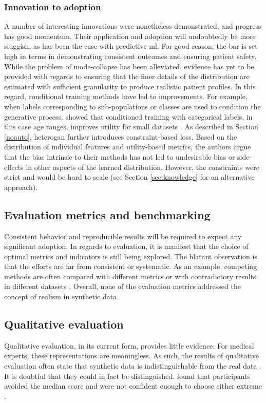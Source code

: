 \subsubsection{Innovation to adoption}
A number of interesting innovations were nonetheless demonstrated, and progress has good momentum. Their application and adoption will undoubtedly be more sluggish, as has been the case with predictive \gls{ml}. For good reason, the bar is set high in terms in demonstrating consistent outcomes and ensuring patient safety. While the problem of \gls{mode-collapse} has been alleviated, evidence has yet to be provided with regards to ensuring that the finer details of the distribution are estimated with sufficient granularity to produce realistic patient profiles. In this regard, conditional training methods have led to improvements. For example, when labels corresponding to sub-populations or classes are used to condition the generative process. \citeauthor{Zhang2020} showed that conditioned training with categorical labels, in this case age ranges, improves utility for small datasets \cite{Zhang2020}. As described in Section \ref{noauto}, \gls{heterogan} further introduces constraint-based loss. Based on the distribution of individual features and utility-based metrics, the authors argue that the bias intrinsic to their methods has not led to undesirable bias or side-effects in other aspects of the learned distribution. However, the constraints were strict and would be hard to scale (see Section \ref{sec:knowledge} for an alternative approach). 

\subsection{Evaluation metrics and benchmarking}
Consistent behavior and reproducible results will be required to expect any significant adoption. In regards to evaluation, it is manifest that the choice of optimal metrics and indicators is still being explored. The blatant observation is that the efforts are far from consistent or systematic. As an example, competing methods are often compared with different metrics or with contradictory results in different datasets \cite{baowaly_2019_IEEE,baowaly_2019_jamia,Camino2018-re,Choi2017-nt,Zhang2020}. Overall, none of the evaluation metrics addressed the concept of realism in synthetic data\par

\subsection{Qualitative evaluation}
Qualitative evaluation, in its current form, provides little evidence. For medical experts, these representations are meaningless. As such, the results of qualitative evaluation often state that synthetic data is indistinguishable from the real data \cite{Choi2017-nt,Wang_2019}. It is doubtful that they could in fact be distinguished. \citeauthor{esteban2017real} found that participants avoided the median score and were not confident enough to choose either extreme \cite{esteban2017real}.\par

